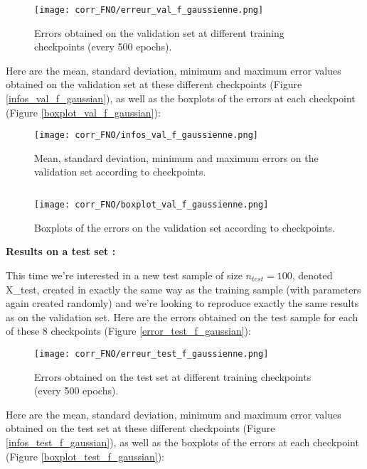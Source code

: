 \begin{figure}[H]
	\centering
	\texttt{[image: corr\_FNO/erreur\_val\_f\_gaussienne.png]}
	\caption{Errors obtained on the validation set at different training checkpoints (every 500 epochs).}
	\label{erreur_val_f_gaussienne}
\end{figure} 

Here are the mean, standard deviation, minimum and maximum error values obtained on the validation set at these different checkpoints (Figure \ref{infos_val_f_gaussian}), as well as the boxplots of the errors at each checkpoint (Figure \ref{boxplot_val_f_gaussian}):

\begin{minipage}{0.48\linewidth}
	\begin{figure}[H]
		\centering
		\texttt{[image: corr\_FNO/infos\_val\_f\_gaussienne.png]}
		\caption{Mean, standard deviation, minimum and maximum errors on the validation set according to checkpoints.}
		\label{infos_val_f_gaussienne}
	\end{figure} 
\end{minipage} $\qquad$
\begin{minipage}{0.48\linewidth}
	\begin{figure}[H]
		\centering
		\texttt{[image: corr\_FNO/boxplot\_val\_f\_gaussienne.png]}
		\caption{Boxplots of the errors on the validation set according to checkpoints.}
		\label{boxplot_val_f_gaussienne}
	\end{figure} 
\end{minipage}

\textbf{Results on a test set :}

This time we're interested in a new test sample of size $n_{test}=100$, denoted X\_test, created in exactly the same way as the training sample (with parameters again created randomly) and we're looking to reproduce exactly the same results as on the validation set. Here are the errors obtained on the test sample for each of these 8 checkpoints (Figure \ref{error_test_f_gaussian}):

\begin{figure}[H]
	\centering
	\texttt{[image: corr\_FNO/erreur\_test\_f\_gaussienne.png]}
	\caption{Errors obtained on the test set at different training checkpoints (every 500 epochs).}
	\label{erreur_test_f_gaussienne}
\end{figure} 

Here are the mean, standard deviation, minimum and maximum error values obtained on the test set at these different checkpoints (Figure \ref{infos_test_f_gaussian}), as well as the boxplots of the errors at each checkpoint (Figure \ref{boxplot_test_f_gaussian}):

